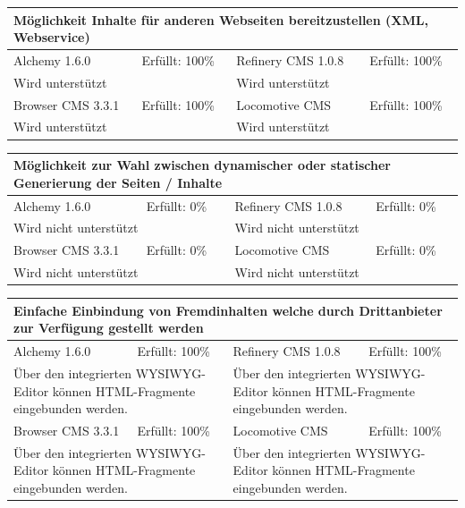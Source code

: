 \begin{tabular}[!ht]{|l|l|l|l|}
\hline
\multicolumn{4}{|p{15cm}|}{\textbf{Möglichkeit Inhalte für anderen Webseiten bereitzustellen (XML, Webservice)}} \\
\hline
  Alchemy 1.6.0 & \cellcolor{green}Erfüllt: 100\% & Refinery CMS 1.0.8 & \cellcolor{green}Erfüllt: 100\% \\
  \hline
  \multicolumn{2}{|p{7.5cm}|}{Wird unterstützt} & \multicolumn{2}{p{7.5cm}|}{Wird unterstützt} \\
  \hline
  Browser CMS 3.3.1 & \cellcolor{green}Erfüllt: 100\% & Locomotive CMS & \cellcolor{green}Erfüllt: 100\% \\
  \hline
  \multicolumn{2}{|p{7.5cm}|}{Wird unterstützt} & \multicolumn{2}{p{7.5cm}|}{Wird unterstützt} \\
\hline
\end{tabular}
\newline
\newline
\newline
\begin{tabular}[!ht]{|l|l|l|l|}
\hline
\multicolumn{4}{|p{15cm}|}{\textbf{Möglichkeit zur Wahl zwischen dynamischer oder statischer Generierung der Seiten / Inhalte}} \\
\hline
  Alchemy 1.6.0 & \cellcolor{red}Erfüllt: 0\% & Refinery CMS 1.0.8 & \cellcolor{red}Erfüllt: 0\% \\
  \hline
  \multicolumn{2}{|p{7.5cm}|}{Wird nicht unterstützt} & \multicolumn{2}{p{7.5cm}|}{Wird nicht unterstützt} \\
  \hline
  Browser CMS 3.3.1 & \cellcolor{red}Erfüllt: 0\% & Locomotive CMS & \cellcolor{red}Erfüllt: 0\% \\
  \hline
  \multicolumn{2}{|p{7.5cm}|}{Wird nicht unterstützt} & \multicolumn{2}{p{7.5cm}|}{Wird nicht unterstützt} \\
\hline
\end{tabular}
\newline
\newline
\newline
\begin{tabular}[!ht]{|l|l|l|l|}
\hline
\multicolumn{4}{|p{15cm}|}{\textbf{Einfache Einbindung von Fremdinhalten welche durch Drittanbieter zur Verfügung gestellt werden}} \\
\hline
  Alchemy 1.6.0 & \cellcolor{green}Erfüllt: 100\% & Refinery CMS 1.0.8 & \cellcolor{green}Erfüllt: 100\% \\
  \hline
  \multicolumn{2}{|p{7.5cm}|}{Über den integrierten WYSIWYG-Editor können HTML-Fragmente eingebunden werden.} & \multicolumn{2}{p{7.5cm}|}{Über den integrierten WYSIWYG-Editor können HTML-Fragmente eingebunden werden.} \\
  \hline
  Browser CMS 3.3.1 & \cellcolor{green}Erfüllt: 100\% & Locomotive CMS & \cellcolor{green}Erfüllt: 100\% \\
  \hline
  \multicolumn{2}{|p{7.5cm}|}{Über den integrierten WYSIWYG-Editor können HTML-Fragmente eingebunden werden.} & \multicolumn{2}{p{7.5cm}|}{Über den integrierten WYSIWYG-Editor können HTML-Fragmente eingebunden werden.} \\
\hline
\end{tabular}
